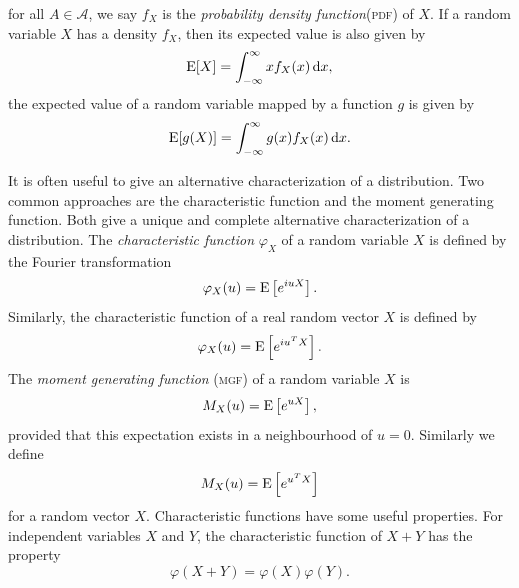 for all \( A \in \mathcal{A} \), we say $f_{X}$ is the \textit{probability density function}(\textsc{pdf}) of $X$.
If a random variable $X$ has a density $f_{X}$, then its expected value is also given by
\[
    \operatorname*{E}[X] = \int_{-\infty}^{\infty} x f_{X}(x) \,\mathrm{d} x,
\]
the expected value of a random variable mapped by a function $g$ is given by
\[
    \operatorname*{E}[g(X)] = \int_{-\infty}^{\infty} g(x) f_{X}(x) \,\mathrm{d} x.
\]
%     


It is often useful to give an alternative characterization of a distribution. 
Two common approaches are the characteristic function and the moment generating function. Both give a unique and complete alternative characterization of a distribution.
The \textit{characteristic function} $\varphi_{X}$ of a random variable $X$ is defined by the Fourier transformation
   \[
       \varphi_{X}(u) = \operatorname*{E}\left[e^{i u X}\right].
   \]
Similarly, the characteristic function of a real random vector $X$ is defined by
   \[
       \varphi_{X}(u) = \operatorname*{E}\left[e^{i u^{T} X}\right].
   \]
The \textit{moment generating function} (\textsc{mgf}) of a random variable $X$ is
\[
    M_{X}(u) = \operatorname*{E}\left[e^{u X}\right],
\]
provided that this expectation exists in a neighbourhood of \( u = 0 \).
Similarly we define
\[
    M_{X}(u) = \operatorname*{E}\left[e^{u^{T} X}\right]    
\]
for a random vector $X$.
Characteristic functions have some useful properties. 
For independent variables $X$ and $Y$, the characteristic function of \( X+Y \) has the property
\[
    \varphi(X+Y) = \varphi(X) \varphi(Y).
\]



